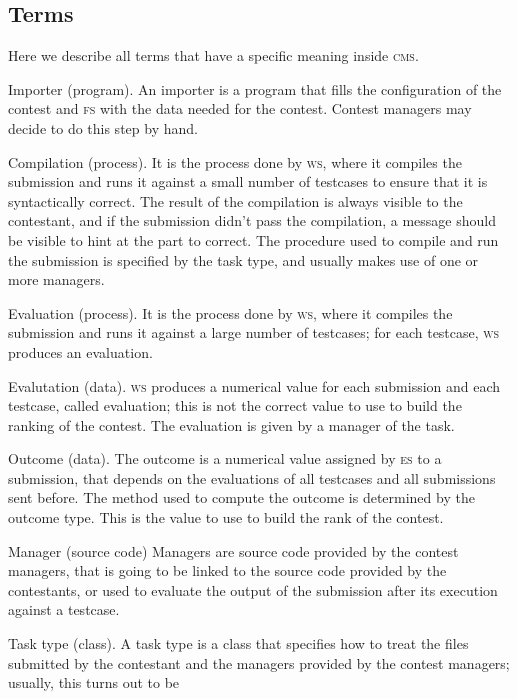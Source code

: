 \documentclass[a4paper,8pt]{amsart}
\newcommand{\CMS}{\textsc{cms}}
\newcommand{\FS}{\textsc{fs}}
\newcommand{\ES}{\textsc{es}}
\newcommand{\WS}{\textsc{ws}}
\newenvironment{squishlist}{%
  \begin{list}{\textbullet}%
    { \setlength{\itemsep}{0pt}%
      \setlength{\parsep}{3pt}%
      \setlength{\topsep}{3pt}%
      \setlength{\partopsep}{0pt}%
      \setlength{\leftmargin}{1.5em}%
      \setlength{\labelwidth}{1em}%
      \setlength{\labelsep}{0.5em} }%
}{\end{list}}
\begin{document}
\begin{multicols}{2}
  \section{Terms}

  Here we describe all terms that have a specific meaning inside \CMS{}.

  \begin{squishlist}
  \item[Importer (program).] An importer is a program that fills the
    configuration of the contest and \FS{} with the data needed for
    the contest. Contest managers may decide to do this step by hand.
  \item[Compilation (process).] It is the process done by \WS{}, where
    it compiles the submission and runs it against a small number of
    testcases to ensure that it is syntactically correct. The result
    of the compilation is always visible to the contestant, and if the
    submission didn't pass the compilation, a message should be
    visible to hint at the part to correct. The procedure used to
    compile and run the submission is specified by the task type, and
    usually makes use of one or more managers.
  \item[Evaluation (process).] It is the process done by \WS{}, where
    it compiles the submission and runs it against a large number of
    testcases; for each testcase, \WS{} produces an evaluation.
  \item[Evalutation (data).] \WS{} produces a numerical value for each
    submission and each testcase, called evaluation; this is not the
    correct value to use to build the ranking of the contest. The
    evaluation is given by a manager of the task.
  \item[Outcome (data).] The outcome is a numerical value assigned by
    \ES{} to a submission, that depends on the evaluations of all
    testcases and all submissions sent before. The method used to
    compute the outcome is determined by the outcome type. This is the
    value to use to build the rank of the contest.
  \item[Manager (source code)] Managers are source code provided by
    the contest managers, that is going to be linked to the source
    code provided by the contestants, or used to evaluate the output
    of the submission after its execution against a testcase.
  \item[Task type (class).] A task type is a class that specifies how
    to treat the files submitted by the contestant and the managers
    provided by the contest managers; usually, this turns out to be

\end{squishlist}
\end{multicols}
\end{document}
